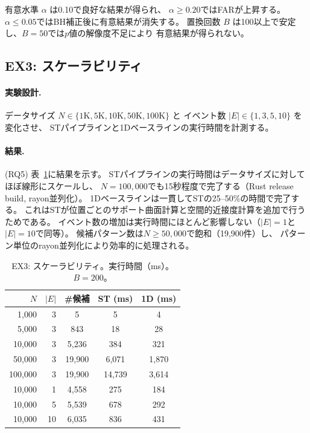 有意水準 $\alpha$ は0.10で良好な結果が得られ、
$\alpha \geq 0.20$ではFARが上昇する。
$\alpha \leq 0.05$ではBH補正後に有意結果が消失する。
置換回数 $B$ は100以上で安定し、$B = 50$では$p$値の解像度不足により
有意結果が得られない。

\subsection{EX3: スケーラビリティ}\label{sec:ex3}

\paragraph{実験設計.}
データサイズ $N \in \{1\mathrm{K}, 5\mathrm{K}, 10\mathrm{K}, 50\mathrm{K}, 100\mathrm{K}\}$ と
イベント数 $|E| \in \{1, 3, 5, 10\}$ を変化させ、
STパイプラインと1Dベースラインの実行時間を計測する。

\paragraph{結果.}
(RQ5) 表~\ref{tab:ex3}に結果を示す。
STパイプラインの実行時間はデータサイズに対してほぼ線形にスケールし、
$N = 100{,}000$でも15秒程度で完了する（Rust release build, rayon並列化）。
1Dベースラインは一貫してSTの25--50\%の時間で完了する。
これはSTが位置ごとのサポート曲面計算と空間的近接度計算を追加で行うためである。
イベント数の増加は実行時間にほとんど影響しない（$|E| = 1$と$|E| = 10$で同等）。
候補パターン数は$N \geq 50{,}000$で飽和（19,900件）し、
パターン単位のrayon並列化により効率的に処理される。

\begin{table}[t]
\centering
\caption{EX3: スケーラビリティ。実行時間（ms）。$B = 200$。}
\label{tab:ex3}
\small
\begin{tabular}{rrccc}
\toprule
$N$ & $|E|$ & \#候補 & ST (ms) & 1D (ms) \\
\midrule
1,000  & 3  & 5     & 5      & 4     \\
5,000  & 3  & 843   & 18     & 28    \\
10,000 & 3  & 5,236 & 384    & 321   \\
50,000 & 3  & 19,900 & 6,071 & 1,870 \\
100,000 & 3 & 19,900 & 14,739 & 3,614 \\
\midrule
10,000 & 1  & 4,558 & 275    & 184   \\
10,000 & 5  & 5,539 & 678    & 292   \\
10,000 & 10 & 6,035 & 836    & 431   \\
\bottomrule
\end{tabular}
\end{table}

